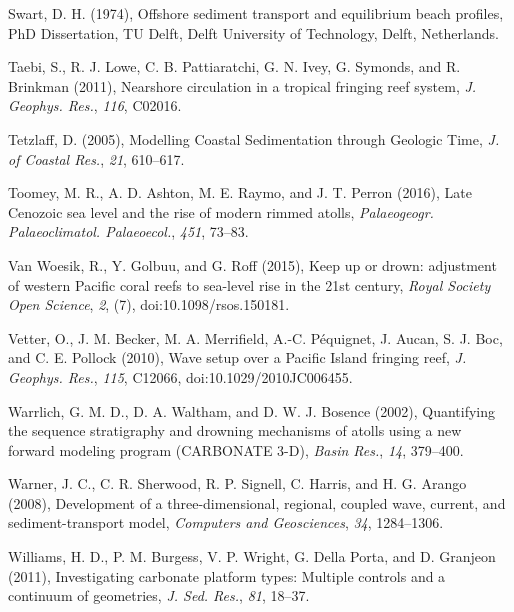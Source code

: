 \documentclass[default,jgrga]{agutex2015}
\begin{document}
\begin{article}
\begin{thebibliography}{}
Swart, D. H. (1974), Offshore sediment transport and equilibrium beach profiles, PhD Dissertation, TU Delft, Delft University of Technology, Delft, Netherlands.

Taebi, S., R. J. Lowe, C. B. Pattiaratchi, G. N. Ivey,  G. Symonds, and R. Brinkman (2011), Nearshore circulation in a
tropical fringing reef system, \textit{J. Geophys. Res.}, \textit{116}, C02016.

Tetzlaff, D. (2005), Modelling Coastal Sedimentation through Geologic Time, \textit{J. of Coastal Res.}, \textit{21}, 610--617.

Toomey, M. R., A. D. Ashton, M. E. Raymo, and J. T. Perron (2016), Late Cenozoic sea level and the rise of modern rimmed atolls, \textit{Palaeogeogr. Palaeoclimatol. Palaeoecol.}, \textit{451}, 73--83.

Van Woesik, R., Y. Golbuu, and G. Roff (2015), Keep up or drown: adjustment of western Pacific coral reefs to sea-level rise in the 21st century, \textit{Royal Society Open Science}, \textit{2}, (7), doi:10.1098/rsos.150181.

Vetter, O., J. M. Becker, M. A. Merrifield, A.-C. P\'equignet, J. Aucan, S. J. Boc, and C. E. Pollock (2010), Wave setup over a Pacific Island fringing reef, \textit{J. Geophys. Res.}, \textit{115}, C12066, doi:10.1029/2010JC006455.

Warrlich, G. M. D., D. A. Waltham, and D. W. J. Bosence (2002), Quantifying the sequence stratigraphy and drowning mechanisms of atolls using a new forward modeling program (CARBONATE 3-D), \textit{Basin Res.}, \textit{14}, 379--400.

Warner, J. C., C. R. Sherwood, R. P. Signell, C. Harris, and H. G. Arango (2008), Development of a three-dimensional, regional, coupled wave, current, and sediment-transport model, \textit{Computers and Geosciences}, \textit{34}, 1284--1306.

Williams, H. D., P. M. Burgess, V. P. Wright, G. Della Porta, and D. Granjeon (2011), Investigating carbonate platform types: Multiple controls and a continuum of geometries, \textit{J. Sed. Res.}, \textit{81}, 18--37.


\end{thebibliography}
\end{article}
\end{document}
